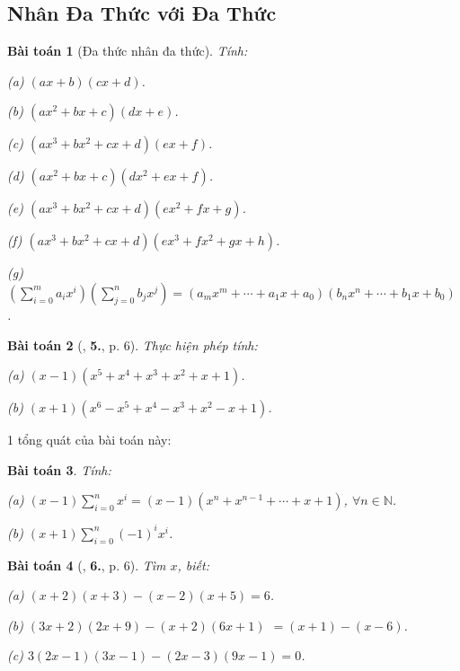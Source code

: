 \documentclass{article}
\numberwithin{equation}{section}
\newtheorem{baitoan}{Bài toán}[section]
\begin{document}
\subsection{Nhân Đa Thức với Đa Thức}

\begin{baitoan}[Đa thức nhân đa thức]
	Tính:
	\begin{enumerate*}
		\item[(a)] $(ax + b)(cx + d)$.
		\item[(b)] $(ax^2 + bx + c)(dx + e)$.
		\item[(c)] $(ax^3 + bx^2 + cx + d)(ex + f)$.
		\item[(d)] $(ax^2 + bx + c)(dx^2 + ex + f)$.
		\item[(e)] $(ax^3 + bx^2 + cx + d)(ex^2 + fx + g)$.
		\item[(f)] $(ax^3 + bx^2 + cx + d)(ex^3 + fx^2 + gx + h)$.
		\item[(g)] $\left(\sum_{i=0}^m a_ix^i\right)\left(\sum_{j=0}^n b_jx^j\right) = (a_mx^m + \cdots + a_1x + a_0)(b_nx^n + \cdots + b_1x + b_0)$.
	\end{enumerate*}
\end{baitoan}

\begin{baitoan}[\cite{Binh_Toan_8_tap_1}, \textbf{5.}, p. 6]
	Thực hiện phép tính:
	\begin{enumerate*}
		\item[(a)] $(x - 1)(x^5 + x^4 + x^3 + x^2 + x + 1)$.
		\item[(b)] $(x + 1)(x^6 - x^5 + x^4 - x^3 + x^2 - x + 1)$.
	\end{enumerate*}
\end{baitoan}
1 tổng quát của bài toán này:

\begin{baitoan}
	Tính:
	\begin{enumerate*}
		\item[(a)] $(x - 1)\sum_{i=0}^n x^i = (x - 1)(x^n + x^{n-1} + \cdots + x + 1)$, $\forall n\in\mathbb{N}$.
		\item[(b)] $(x + 1)\sum_{i=0}^n (-1)^ix^i$.
	\end{enumerate*}
\end{baitoan}

\begin{baitoan}[\cite{Binh_Toan_8_tap_1}, \textbf{6.}, p. 6]
	Tìm $x$, biết:
	\begin{enumerate*}
		\item[(a)] $(x + 2)(x + 3) - (x - 2)(x + 5) = 6$.
		\item[(b)] $(3x + 2)(2x + 9) - (x + 2)(6x + 1)$ $= (x + 1) - (x - 6)$.
		\item[(c)] $3(2x - 1)(3x - 1) - (2x - 3)(9x - 1) = 0$.
	\end{enumerate*}
\end{baitoan}
\end{document}
